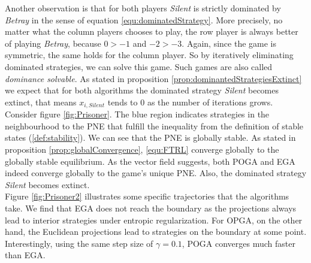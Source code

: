Another observation is that for both players \textit{Silent} is strictly dominated by \textit{Betray} in the sense of equation \ref{equ:dominatedStrategy}. More precisely, no matter what the column players chooses to play, the row player is always better of playing \textit{Betray}, because $0 > -1$ and $-2 > -3$. Again, since the game is symmetric, the same holds for the column player. So by iteratively eliminating dominated strategies, we can solve this game. Such games are also called \textit{dominance solvable}. As stated in proposition \ref{prop:dominantedStrategiesExtinct} we expect that for both algorithms the dominated strategy \textit{Silent} becomes extinct, that means $x_{i,Silent}$ tends to $0$ as the number of iterations grows.  \\

Consider figure \ref{fig:Prisoner}. The blue region indicates strategies in the neighbourhood to the PNE that fulfill the inequality from the definition of stable states (\ref{def:stability}). We can see that the PNE is globally stable. As stated in proposition \ref{prop:globalConvergence}, \ref{equ:FTRL} converge globally to the globally stable equilibrium. As the vector field suggests, both POGA and EGA indeed converge globally to the game's unique PNE. Also, the dominated strategy \textit{Silent} becomes extinct. \\

Figure \ref{fig:Prisoner2} illustrates some specific trajectories that the algorithms take. We find that EGA does not reach the boundary as the projections always lead to interior strategies under entropic regularization. For OPGA, on the other hand, the Euclidean projections lead to strategies on the boundary at some point. Interestingly, using the same step size of $\gamma = 0.1$, POGA converges much faster than EGA. 


